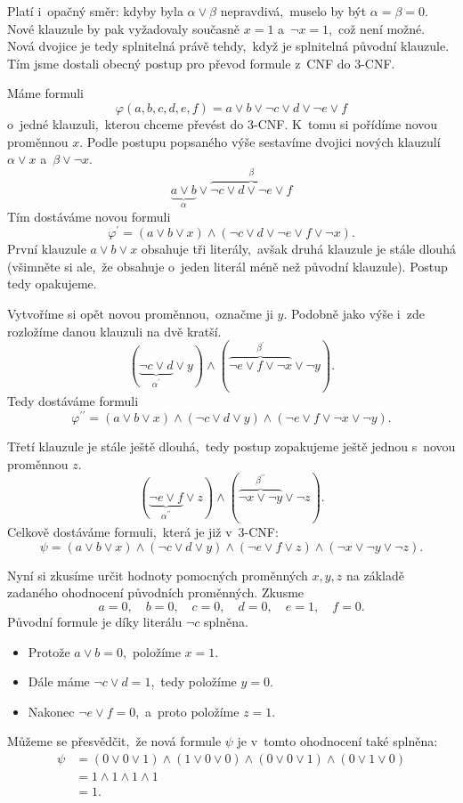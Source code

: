 Platí i~opačný směr: kdyby byla $\alpha\lor\beta$ nepravdivá,~muselo by být $\alpha=\beta=0$. Nové klauzule by pak vyžadovaly současně $x=1$ a~$\neg x=1$,~což není možné. Nová dvojice je tedy splnitelná právě tehdy,~když je splnitelná původní klauzule.
Tím jsme dostali obecný postup pro převod formule z~CNF do 3-CNF.
\begin{example}
    Máme formuli
    \[
        \varphi(a,b,c,d,e,f)=a\lor b\lor\neg c\lor d\lor\neg e\lor f
    \]
    o~jedné klauzuli,~kterou chceme převést do 3-CNF. K~tomu si pořídíme novou proměnnou $x$. Podle postupu popsaného výše sestavíme dvojici nových klauzulí $\alpha\lor x$ a~$\beta\lor\neg x$.
    \[\underbrace{a\lor b}_{\alpha}\lor \overbrace{\neg c\lor d\lor\neg e\lor f}^{\beta}\]
    Tím dostáváme novou formuli
    \[
        \varphi^\prime=(a\lor b\lor x)
        \land(\neg c\lor d\lor\neg e\lor f\lor\neg x).
    \]
    První klauzule $a\lor b\lor x$ obsahuje tři literály,~avšak druhá klauzule je stále dlouhá (všimněte si ale,~že obsahuje o~jeden literál méně než původní klauzule). Postup tedy opakujeme.

    Vytvoříme si opět novou proměnnou,~označme ji $y$. Podobně jako výše i~zde rozložíme danou klauzuli na dvě kratší.
    \[
        (\underbrace{\neg c\lor d}_{\alpha^\prime}\lor y)
        \land(\overbrace{\neg e\lor f\lor\neg x}^{\beta^\prime}\lor\neg y).
    \]
    Tedy dostáváme formuli
    \[
        \varphi^{\prime\prime}
        =(a\lor b\lor x)\land(\neg c\lor d\lor y)
        \land(\neg e\lor f\lor\neg x\lor\neg y).
    \]

    Třetí klauzule je stále ještě dlouhá,~tedy postup zopakujeme ještě jednou s~novou proměnnou $z$.
    \[
        (\underbrace{\neg e\lor f}_{\alpha^{\prime\prime}}\lor z)
        \land(\overbrace{\neg x\lor\neg y}^{\beta^{\prime\prime}}\lor\neg z).
    \]
    Celkově dostáváme formuli,~která je již v~3-CNF:
    \[
        \psi=(a\lor b\lor x)\land(\neg c\lor d\lor y)
        \land(\neg e\lor f\lor z)\land(\neg x\lor\neg y\lor\neg z).
    \]

    Nyní si zkusíme určit hodnoty pomocných proměnných $x,y,z$ na základě zadaného ohodnocení původních proměnných. Zkusme
    \[
        a=0,\quad b=0,\quad c=0,\quad d=0,\quad e=1,\quad f=0.
    \]
    Původní formule je díky literálu $\neg c$ splněna.
    \begin{itemize}
        \item Protože $a\lor b=0$,~položíme $x=1$.
        \item Dále máme $\neg c\lor d=1$,~tedy položíme $y=0$.
        \item Nakonec $\neg e\lor f=0$,~a~proto položíme $z=1$.
    \end{itemize}
    Můžeme se přesvědčit,~že nová formule $\psi$ je v~tomto ohodnocení také splněna:
    \begin{align*}
        \psi&=(0\lor0\lor1)\land(1\lor0\lor0)
        \land(0\lor0\lor1)\land(0\lor1\lor0)\\
        &=1\land 1\land 1\land 1\\
        &=1.
    \end{align*}
\end{example}

